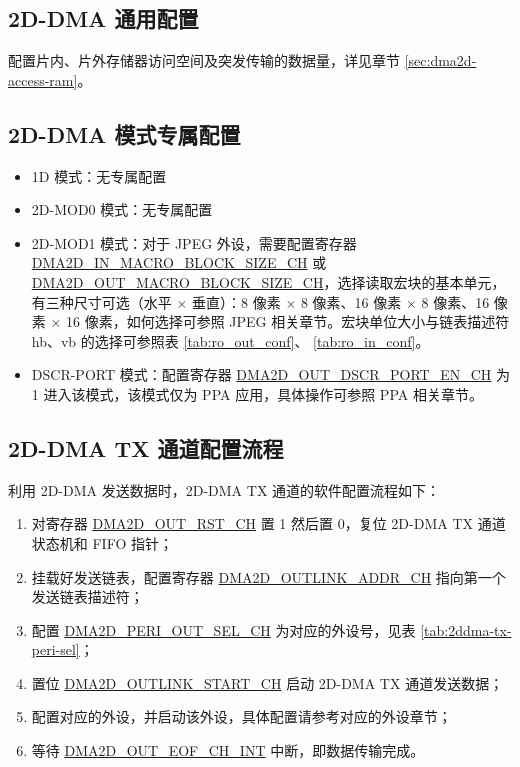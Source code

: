 \documentclass[main\_\_CN.tex]{subfiles}
\begin{document}
\subsection{2D-DMA 通用配置}

配置片内、片外存储器访问空间及突发传输的数据量，详见章节 \ref{sec:dma2d-access-ram}。


\subsection{2D-DMA 模式专属配置}
\begin{itemize}
\item 1D 模式：无专属配置
\item 2D-MOD0 模式：无专属配置
\item 2D-MOD1 模式：对于 JPEG 外设，需要配置寄存器 \hyperref[fielddesc:DMA2DINMACROBLOCKSIZECHN]{DMA2D\_IN\_MACRO\_BLOCK\_SIZE\_CH} 或 \hyperref[fielddesc:DMA2DOUTMACROBLOCKSIZECHN]{DMA2D\_OUT\_MACRO\_BLOCK\_SIZE\_CH}，选择读取宏块的基本单元，有三种尺寸可选（水平 $\times$ 垂直）：8 像素 $\times$ 8 像素、16 像素 $\times$ 8 像素、16 像素 $\times$ 16 像素，如何选择可参照 JPEG 相关章节。宏块单位大小与链表描述符 hb、vb 的选择可参照表 \ref{tab:ro_out_conf}、 \ref{tab:ro_in_conf}。
\item DSCR-PORT 模式：配置寄存器 \hyperref[fielddesc:DMA2DOUTDSCRPORTENCHN]{DMA2D\_OUT\_DSCR\_PORT\_EN\_CH} 为 1 进入该模式，该模式仅为 PPA 应用，具体操作可参照 PPA 相关章节。
\end{itemize}


\subsection{2D-DMA TX 通道配置流程}
利用 2D-DMA 发送数据时，2D-DMA TX 通道的软件配置流程如下：
\begin{enumerate}
    \item 对寄存器 \hyperref[fielddesc:DMA2DOUTRSTCHN]{DMA2D\_OUT\_RST\_CH} 置 1 然后置 0，复位 2D-DMA TX 通道状态机和 FIFO 指针；
    \item 挂载好发送链表，配置寄存器 \hyperref[fielddesc:DMA2DOUTLINKADDRCHN]{DMA2D\_OUTLINK\_ADDR\_CH} 指向第一个发送链表描述符；
    \item 配置 \hyperref[fielddesc:DMA2DOUTPERISELCHN]{DMA2D\_PERI\_OUT\_SEL\_CH} 为对应的外设号，见表 \ref{tab:2ddma-tx-peri-sel}；
    \item 置位 \hyperref[fielddesc:DMA2DOUTLINKSTARTCHN]{DMA2D\_OUTLINK\_START\_CH} 启动 2D-DMA TX 通道发送数据；
    \item 配置对应的外设，并启动该外设，具体配置请参考对应的外设章节；
    \item 等待 \hyperref[int:DMA2DOUTEOFINT]{DMA2D\_OUT\_EOF\_CH\_INT} 中断，即数据传输完成。
\end{enumerate}
\end{document}
